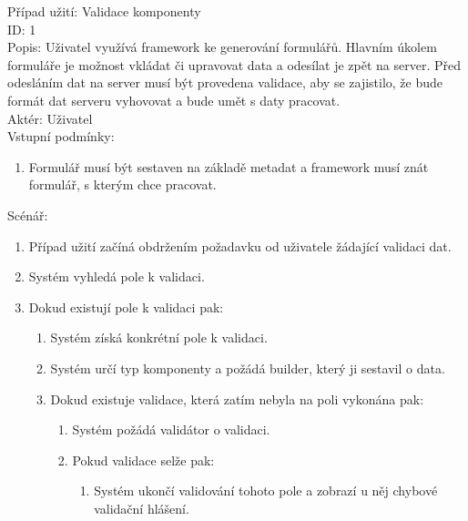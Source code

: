 Případ užití: Validace komponenty\\
ID: 1\\
Popis: 
Uživatel využívá framework ke generování formulářů. Hlavním úkolem formuláře je možnost vkládat či upravovat data a odesílat je zpět na server. Před odesláním dat na server musí být provedena validace, aby se zajistilo, že bude formát dat serveru vyhovovat a bude umět s daty pracovat.
\\
Aktér: Uživatel\\
Vstupní podmínky:
\begin{enumerate}
\item Formulář musí být sestaven na základě metadat a framework musí znát formulář, s kterým chce pracovat.
\end{enumerate}
Scénář:
\begin{enumerate}
\item Případ užití začíná obdržením požadavku od uživatele žádající validaci dat.
\item Systém vyhledá pole k validaci.
\item Dokud existují pole k validaci pak:
\begin{enumerate}
\item Systém získá konkrétní pole k validaci.
\item Systém určí typ komponenty a požádá builder, který ji sestavil o data.
\item Dokud existuje validace, která zatím nebyla na poli vykonána pak:
\begin{enumerate}
\item Systém požádá validátor o validaci.
\item Pokud validace selže pak:
\begin{enumerate}
\item Systém ukončí validování tohoto pole a zobrazí u něj chybové validační hlášení.
\end{enumerate}
\end{enumerate}
\end{enumerate}
\end{enumerate}

